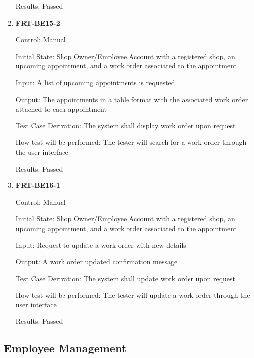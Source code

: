 \documentclass[12pt, titlepage]{article}
\begin{document}
\begin{enumerate}
	      Results: Passed

	\item \textbf{FRT-BE15-2}

	      Control: Manual

	      Initial State: Shop Owner/Employee Account with a registered shop, an upcoming appointment, and a
	      work order associated to the appointment

	      Input: A list of upcoming appointments is requested

	      Output: The appointments in a table format with the associated work order attached to each
	      appointment

	      Test Case Derivation: The system shall display work order upon request

	      How test will be performed: The tester will search for a work order through the user interface

	      Results: Passed

	\item \textbf{FRT-BE16-1}

	      Control: Manual

	      Initial State: Shop Owner/Employee Account with a registered shop, an upcoming appointment, and a
	      work order associated to the appointment

	      Input: Request to update a work order with new details

	      Output: A work order updated confirmation message

	      Test Case Derivation: The system shall update work order upon request

	      How test will be performed: The tester will update a work order through the user interface

	      Results: Passed

\end{enumerate}

\subsection{Employee Management}
\end{document}
